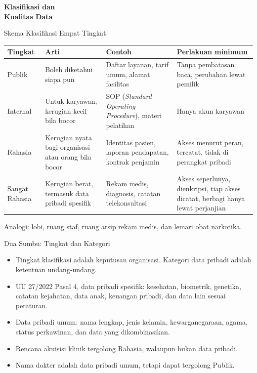 \documentclass[aspectratio=169, table, 12pt]{beamer}
\begin{document}
\begin{frame}{\hfill}
  \centering
  \Huge{\textbf{Klasifikasi dan\\Kualitas Data}}
\end{frame}

\begin{frame}{{\Large Skema Klasifikasi Empat Tingkat}}
  \scriptsize
  \begin{tabularx}{\textwidth}{lXXX}
    \hline
    \textbf{Tingkat} & \textbf{Arti} & \textbf{Contoh} & \textbf{Perlakuan minimum} \\
    \hline
    Publik & Boleh diketahui siapa pun & Daftar layanan, tarif umum, alamat
      fasilitas & Tanpa pembatasan baca, perubahan lewat pemilik \\
    \hline
    Internal & Untuk karyawan, kerugian kecil bila bocor & SOP (\textit{Standard
      Operating Procedure}), materi pelatihan & Hanya akun karyawan \\
    \hline
    Rahasia & Kerugian nyata bagi organisasi atau orang bila bocor & Identitas
      pasien, laporan pendapatan, kontrak penjamin & Akses menurut peran,
      tercatat, tidak di perangkat pribadi \\
    \hline
    Sangat Rahasia & Kerugian berat, termasuk data pribadi spesifik & Rekam
      medis, diagnosis, catatan telekonsultasi & Akses seperlunya, dienkripsi,
      tiap akses dicatat, berbagi hanya lewat perjanjian \\
    \hline
  \end{tabularx}

  \vspace{6pt}
  \small Analogi: lobi, ruang staf, ruang arsip rekam medis, dan lemari obat narkotika.
\end{frame}

\begin{frame}{{\Large Dua Sumbu: Tingkat dan Kategori}}
  \vspace{6pt}
  \small
  \begin{itemize}
    \item Tingkat klasifikasi adalah keputusan organisasi. Kategori data pribadi adalah ketentuan
          undang-undang.
    \item UU 27/2022 Pasal 4, data pribadi spesifik: kesehatan, biometrik, genetika, catatan kejahatan,
          data anak, keuangan pribadi, dan data lain sesuai peraturan.
    \item Data pribadi umum: nama lengkap, jenis kelamin, kewarganegaraan, agama, status perkawinan, dan
          data yang dikombinasikan.
    \item Rencana akuisisi klinik tergolong Rahasia, walaupun bukan data pribadi.
    \item Nama dokter adalah data pribadi umum, tetapi dapat tergolong Publik.
  \end{itemize}
\end{frame}
\end{document}
